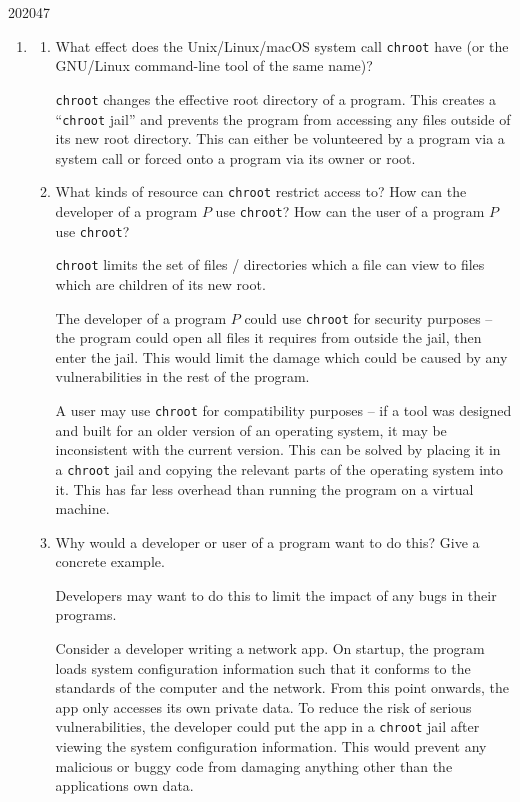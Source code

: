 \documentclass[10pt,\jkfside,a4paper]{article}
\begin{document}
\begin{examquestion}{2020}{4}{7}

\begin{enumerate}

\item

\begin{enumerate}

\item What effect does the Unix/Linux/macOS system call \texttt{chroot} have (or
the GNU/Linux command-line tool of the same name)?

\texttt{chroot} changes the effective root directory of a program. This
creates a ``\texttt{chroot} jail'' and prevents the program from accessing
any files outside of its new root directory. This can either be volunteered
by a program via a system call or forced onto a program via its owner or
root.

\item What kinds of resource can \texttt{chroot} restrict access to? How
can the developer of a program $P$ use \texttt{chroot}? How can the user of
a program $P$ use \texttt{chroot}?

\texttt{chroot} limits the set of files / directories which a file can view
to files which are children of its new root.

The developer of a program $P$ could use \texttt{chroot} for security
purposes -- the program could open all files it requires from outside the
jail, then enter the jail. This would limit the damage which could be caused
by any vulnerabilities in the rest of the program.

A user may use \texttt{chroot} for compatibility purposes -- if a tool was
designed and built for an older version of an operating system, it may be
inconsistent with the current version. This can be solved by placing it in a
\texttt{chroot} jail and copying the relevant parts of the operating system
into it. This has far less overhead than running the program on a virtual
machine.

\item Why would a developer or user of a program want to do this? Give a
concrete example.

Developers may want to do this to limit the impact of any bugs in their
programs.

Consider a developer writing a network app. On startup, the program loads
system configuration information such that it conforms to the standards of the
computer and the network. From this point onwards, the app only accesses
its own private data. To reduce the risk of serious vulnerabilities, the
developer could put the app in a \texttt{chroot} jail after viewing the
system configuration information. This would prevent any malicious or buggy
code from damaging anything other than the applications own data.


\end{enumerate}
\end{enumerate}
\end{examquestion}
\end{document}
